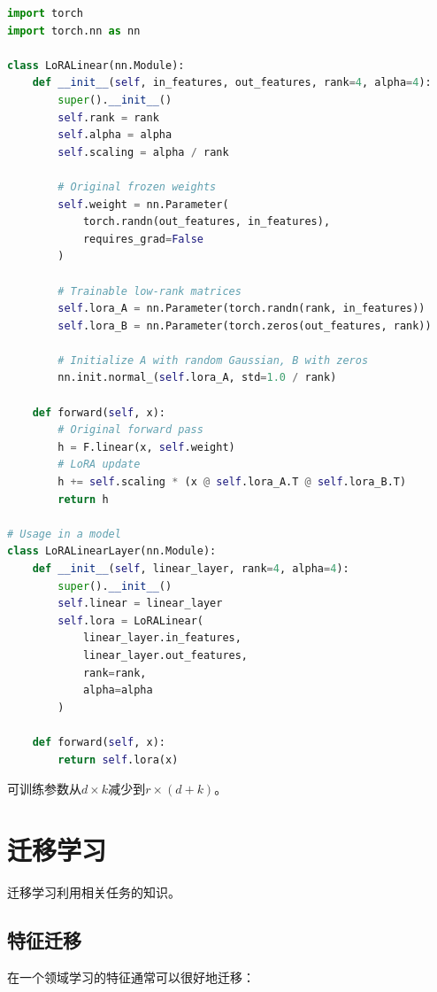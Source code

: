 \begin{code}
    \label{code:lora}
\begin{lstlisting}[language=python]
import torch
import torch.nn as nn

class LoRALinear(nn.Module):
    def __init__(self, in_features, out_features, rank=4, alpha=4):
        super().__init__()
        self.rank = rank
        self.alpha = alpha
        self.scaling = alpha / rank
        
        # Original frozen weights
        self.weight = nn.Parameter(
            torch.randn(out_features, in_features), 
            requires_grad=False
        )
        
        # Trainable low-rank matrices
        self.lora_A = nn.Parameter(torch.randn(rank, in_features))
        self.lora_B = nn.Parameter(torch.zeros(out_features, rank))
        
        # Initialize A with random Gaussian, B with zeros
        nn.init.normal_(self.lora_A, std=1.0 / rank)
    
    def forward(self, x):
        # Original forward pass
        h = F.linear(x, self.weight)
        # LoRA update
        h += self.scaling * (x @ self.lora_A.T @ self.lora_B.T)
        return h

# Usage in a model
class LoRALinearLayer(nn.Module):
    def __init__(self, linear_layer, rank=4, alpha=4):
        super().__init__()
        self.linear = linear_layer
        self.lora = LoRALinear(
            linear_layer.in_features,
            linear_layer.out_features,
            rank=rank,
            alpha=alpha
        )
    
    def forward(self, x):
        return self.lora(x)
\end{lstlisting}
\end{code}

可训练参数从$d \times k$减少到$r \times (d + k)$。

\section{迁移学习}

迁移学习利用相关任务的知识。

\subsection{特征迁移}

在一个领域学习的特征通常可以很好地迁移：

